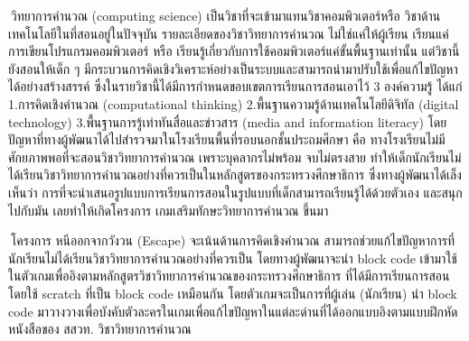 \maketitle
\makesignature

\ifproject
\begin{abstractTH}

$\>$วิทยาการคำนวณ (computing science) เป็นวิชาที่จะเข้ามาแทนวิชาคอมพิวเตอร์หรือ วิชาด้านเทคโนโลยีในที่สอนอยู่ในปัจจุบัน 
รายละเอียดของวิชาวิทยาการคำนวณ ไม่ใช่แค่ให้ผู้เรียน เรียนแค่การเขียนโปรแกรมคอมพิวเตอร์ หรือ เรียนรู้เกี่ยวกับการใช้คอมพิวเตอร์แค่ขั้นพื้นฐานเท่านั้น 
แต่วิชานี้ยังสอนให้เด็ก ๆ มีกระบวนการคิดเชิงวิเคราะห์อย่างเป็นระบบและสามารถนำมาปรับใช้เพื่อแก้ไขปัญหาได้อย่างสร้างสรรค์ 
ซึ่งในรายวิชานี้ได้มีการกำหนดขอบเขตการเรียนการสอนเอาไว้ 3 องค์ความรู้ ได้แก่ 1.การคิดเชิงคำนวณ 
(computational thinking) 2.พื้นฐานความรู้ด้านเทคโนโลยีดิจิทัล (digital technology) 
3.พื้นฐานการรู้เท่าทันสื่อและข่าวสาร (media and information literacy) 
โดยปัญหาที่ทางผู้พัฒนาได้ไปสำรวจมาในโรงเรียนพื้นที่รอบนอกชั้นประถมศึกษา คือ ทางโรงเรียนไม่มีศักยภาพพอที่จะสอนวิชาวิทยาการคำนวณ 
เพราะบุคลากรไม่พร้อม จบไม่ตรงสาย ทำให้เด็กนักเรียนไม่ได้เรียนวิชาวิทยาการคำนวณอย่างที่ควรเป็นในหลักสูตรของกระทรวงศึกษาธิการ 
ซึ่งทางผู้พัฒนาได้เล็งเห็นว่า การที่จะนำเสนอรูปแบบการเรียนการสอนในรูปแบบที่เด็กสามารถเรียนรู้ได้ด้วยตัวเอง และสนุกไปกับมัน 
เลยทำให้เกิดโครงการ เกมเสริมทักษะวิทยาการคำนวณ ขึ้นมา

$\>$โครงการ หนีออกจากวังวน (Escape) จะเน้นด้านการคิดเชิงคำนวณ 
สามารถช่วยแก้ไขปัญหาการที่นักเรียนไม่ได้เรียนวิชาวิทยาการคำนวณอย่างที่ควรเป็น 
โดยทางผู้พัฒนาจะนำ block code เข้ามาใช้ในตัวเกมเพื่ออิงตามหลักสูตรวิชาวิทยาการคำนวณของกระทรวงศึกษาธิการ 
ที่ได้มีการเรียนการสอนโดยใช้ scratch ที่เป็น block code เหมือนกัน 
โดยตัวเกมจะเป็นการที่ผู้เล่น (นักเรียน) นำ block code มาวางวางเพื่อบังคับตัวละครในเกมเพื่อแก้ไขปัญหาในแต่ละด่านที่ได้ออกแบบอิงตามแบบฝึกหัดหนังสือของ 
สสวท. วิชาวิทยาการคำนวณ
\end{abstractTH}

